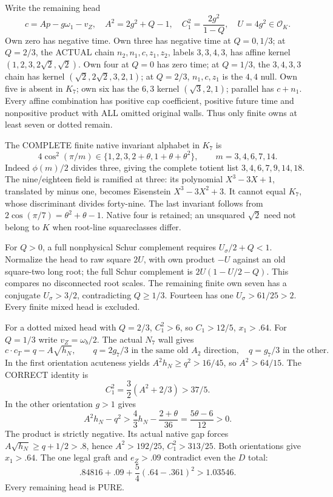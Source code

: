 \documentclass[11pt]{article}
\begin{document}
Write the remaining head
\[
 c=Ap-g\omega_1-v_Z,\quad
 A^2=2g^2+Q-1,\quad
 C_1^2={\frac{2g^2}{1-Q}},\quad U=4g^2\in\mathcal O_K.
\]
Own zero has negative time.
Own three has negative time at \(Q=0,1/3\);
at \(Q=2/3\), the ACTUAL chain
\(n_2,n_1,c,z_1,z_2\), labels \(3,3,4,3\),
has affine kernel \((1,2,3,2\sqrt2,\sqrt2)\).
Own four at \(Q=0\) has zero time;
at \(Q=1/3\), the \(3,4,3,3\) chain has kernel
\((\sqrt2,2\sqrt2,3,2,1)\);
at \(Q=2/3\), \(n_1,c,z_1\) is the \(4,4\) null.
Own five is absent in \(K_7\); own six has the
\(6,3\) kernel \((\sqrt3,2,1)\);
parallel has \(c+n_1\).
Every affine combination has positive cap coefficient,
positive future time and nonpositive product with
ALL omitted original walls.
Thus only finite owns at least seven or dotted remain.

The COMPLETE finite native invariant alphabet in \(K_7\) is
\[
           4\cos^2(\pi/m)\in
             \{1,2,3,2+\theta,1+\theta+\theta^2\},
 \qquad m=3,4,6,7,14 .
\tag{TA}\label{eq:arithK7native}
\]
Indeed \(\phi(m)/2\) divides three, giving the
complete totient list \(3,4,6,7,9,14,18\).
The nine/eighteen field is ramified at three:
its polynomial \(X^3-3X+1\), translated by minus one,
becomes Eisenstein \(X^3-3X^2+3\).
It cannot equal \(K_7\), whose discriminant divides
forty-nine.
The last invariant follows from
\(2\cos(\pi/7)=\theta^2+\theta-1\).
Native four is retained; an unsquared \(\sqrt2\)
need not belong to \(K\) when root-line squareclasses differ.

For \(Q>0\), a full nonphysical Schur complement
requires \(U_\sigma/2+Q<1\).
Normalize the head to raw square \(2U\), with own
product \(-U\) against an old square-two long root;
the full Schur complement is \(2U(1-U/2-Q)\).
This compares no disconnected root scales.
The remaining finite own seven has a conjugate
\(U_\sigma>3/2\), contradicting \(Q\ge1/3\).
Fourteen has one \(U_\sigma>61/25>2\).
Every finite mixed head is excluded.

For a dotted mixed head with \(Q=2/3\),
\(C_1^2>6\), so \(C_1>12/5\), \(x_1>.64\).
For \(Q=1/3\) write \(v_Z=\omega_b/2\).
The actual \(N_7\) wall gives
\[
 c\cdot c_T=q-A\sqrt{h_N},\qquad
 q=2g_7/3\text{ in the same old }A_2\text{ direction},
 \quad q=g_7/3\text{ in the other}.
\]
In the first orientation acuteness yields
\(A^2h_N\ge q^2>16/45\), so \(A^2>64/15\).
The CORRECT identity is
\[
                         C_1^2={\frac{3}{2}}(A^2+2/3)>37/5 .
\]
In the other orientation \(g>1\) gives
\[
 A^2h_N-q^2>{\frac{4}{3}}h_N-{\frac{2+\theta}{36}}
                  ={\frac{5\theta-6}{12}}>0 .
\]
The product is strictly negative.
Its actual native gap forces
\(A\sqrt{h_N}\ge q+1/2>.8\), hence
\(A^2>192/25\), \(C_1^2>313/25\).
Both orientations give \(x_1>.64\).
The one legal graft and \(e_Z>.09\) contradict
even the \(D\) total:
\[
                  .84816+.09+{\frac{5}{4}}(.64-.361)^2>1.03546 .
\]
Every remaining head is PURE.
\end{document}
